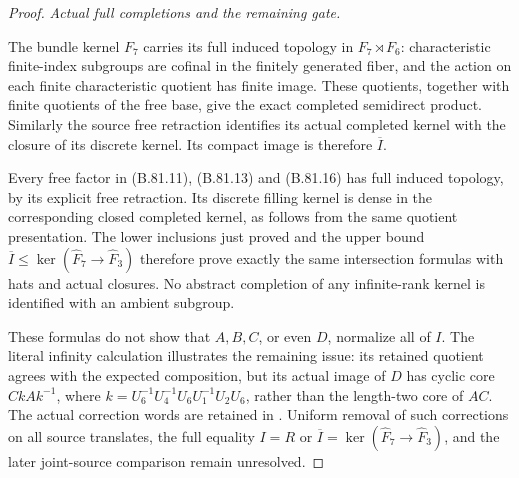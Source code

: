 \begin{proof}
\emph{Actual full completions and the remaining gate.}\par
The bundle kernel \(F_7\) carries its full induced topology in
\(F_7\rtimes F_6\): characteristic finite-index subgroups are
cofinal in the finitely generated fiber, and the action on each
finite characteristic quotient has finite image. These quotients,
together with finite quotients of the free base, give the exact
completed semidirect product. Similarly the source free retraction
identifies its actual completed kernel with the closure of its
discrete kernel. Its compact image is therefore \(\overline I\).

Every free factor in (B.81.11), (B.81.13) and (B.81.16) has full
induced topology, by its explicit free retraction. Its discrete
filling kernel is dense in the corresponding closed completed
kernel, as follows from the same quotient presentation. The lower
inclusions just proved and the upper bound
\(\overline I\leq\ker(\widehat F_7\to\widehat F_3)\) therefore
prove exactly the same intersection formulas with hats and actual
closures. No abstract completion of any infinite-rank kernel is
identified with an ambient subgroup.

These formulas do not show that \(A,B,C\), or even \(D\), normalize
all of \(I\). The literal infinity calculation illustrates the
remaining issue: its retained quotient agrees with the expected
composition, but its actual image of \(D\) has cyclic core
\(CkAk^{-1}\), where
\(k=U_6^{-1}U_4^{-1}U_6U_1^{-1}U_2U_6\), rather than the length-two
core of \(AC\). The actual correction words are retained in
. Uniform removal of such
corrections on all source translates, the full equality \(I=R\)
or \(\overline I=\ker(\widehat F_7\to\widehat F_3)\), and the
later joint-source comparison remain unresolved.
\end{proof}

